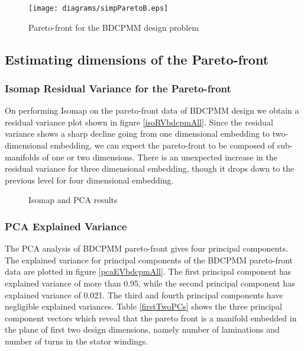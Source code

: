  
\begin{figure}[ht]\begin{center}
 \texttt{[image: diagrams/simpParetoB.eps]} 
 \caption{Pareto-front for the BDCPMM design problem}
 \label{simpParetoB}
\end{center}\end{figure}


\subsection{Estimating dimensions of the Pareto-front}

\subsubsection{Isomap Residual Variance for the Pareto-front}
On performing Isomap on the pareto-front data of BDCPMM design we 
obtain a residual variance plot shown in figure \ref{isoRVbdcpmAll}. 
Since the residual variance shows a sharp decline going from one 
dimensional embedding to two-dimensional embedding, we can expect the 
pareto-front to be composed of sub-manifolds of one or two dimensions.
There is an unexpected increase in the residual variance for three 
dimensional embedding, though it drops down to the previous level for 
four dimensional embedding. 

\begin{figure}[ht]\begin{center}
 \caption{Isomap and PCA results}
 \label{bdcpmmVar}
\end{center}\end{figure}

\subsubsection{PCA Explained Variance}
The PCA analysis of BDCPMM pareto-front gives four principal 
components.  The explained variance for 
principal components of the BDCPMM pareto-front data are plotted in 
figure \ref{pcaEVbdcpmAll}. The first principal component has 
explained variance of more than 0.95, while the second principal 
component has explained variance of 0.021. The third and fourth 
principal components have negligible explained variances. Table 
\ref{firstTwoPCs} shows the three principal component vectors which 
reveal that the pareto front is a manifold embedded in the plane of 
first two design dimensions, namely number of laminations and number 
of turns in the stator windings.
 

